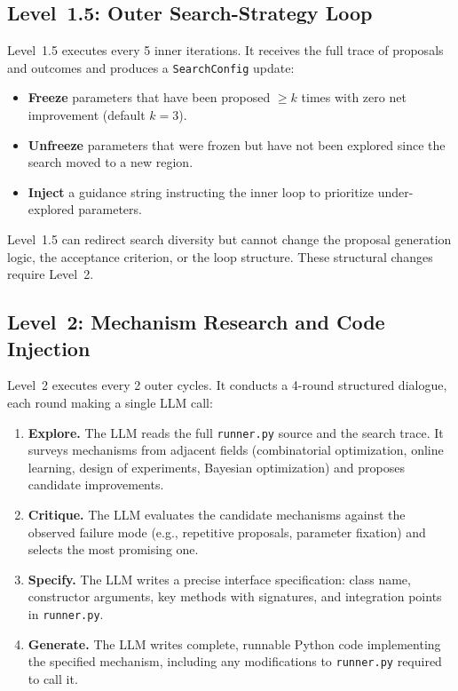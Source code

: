 \subsection{Level~1.5: Outer Search-Strategy Loop}

Level~1.5 executes every 5 inner iterations.
It receives the full trace of proposals and outcomes and produces a
\texttt{SearchConfig} update:
\begin{itemize}
  \item \textbf{Freeze} parameters that have been proposed $\geq k$ times with
        zero net improvement (default $k=3$).
  \item \textbf{Unfreeze} parameters that were frozen but have not been
        explored since the search moved to a new region.
  \item \textbf{Inject} a guidance string instructing the inner loop to
        prioritize under-explored parameters.
\end{itemize}
Level~1.5 can redirect search diversity but cannot change the proposal
generation logic, the acceptance criterion, or the loop structure.
These structural changes require Level~2.

\subsection{Level~2: Mechanism Research and Code Injection}

Level~2 executes every 2 outer cycles.
It conducts a 4-round structured dialogue, each round making a single LLM call:

\begin{enumerate}
  \item \textbf{Explore.} The LLM reads the full \texttt{runner.py} source and
        the search trace.
        It surveys mechanisms from adjacent fields (combinatorial optimization,
        online learning, design of experiments, Bayesian optimization) and
        proposes candidate improvements.
  \item \textbf{Critique.} The LLM evaluates the candidate mechanisms against
        the observed failure mode (e.g., repetitive proposals, parameter
        fixation) and selects the most promising one.
  \item \textbf{Specify.} The LLM writes a precise interface specification:
        class name, constructor arguments, key methods with signatures, and
        integration points in \texttt{runner.py}.
  \item \textbf{Generate.} The LLM writes complete, runnable Python code
        implementing the specified mechanism, including any modifications to
        \texttt{runner.py} required to call it.
\end{enumerate}

